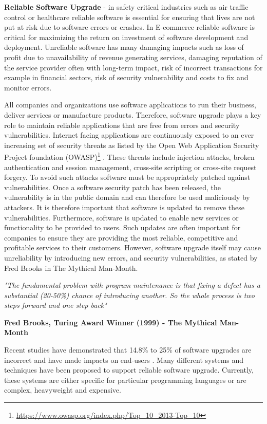 \documentclass[a4paper,11pt,twoside]{report}
\begin{document}
\setlength{\leftskip}{0.5cm}
\setlength{\rightskip}{0.5cm}
\noindent \textbf{Reliable Software Upgrade} - in safety critical industries such as air traffic control or healthcare reliable software is essential for ensuring that lives are not put at risk due to software errors or crashes. In E-commerce reliable software is critical for maximizing the return on investment of software development and deployment. Unreliable software has many damaging impacts such as loss of profit due to unavailability of revenue generating services, damaging reputation of the service provider often with long-term impact, risk of incorrect transactions for example in financial sectors, risk of security vulnerability and costs to fix and monitor errors.

All companies and organizations use software applications to run their business, deliver services or manufacture products. Therefore, software upgrade plays a key role to maintain reliable applications that are free from errors and security vulnerabilities.   Internet facing applications are continuously exposed to an ever increasing set of security threats as listed by the Open Web Application Security Project foundation (OWASP)\footnote{\url{https://www.owasp.org/index.php/Top_10_2013-Top_10}} . These threats include injection attacks, broken authentication and session management, cross-site scripting or cross-site request forgery. To avoid such attacks software must be appropriately patched against vulnerabilities. Once a software security patch has been released, the vulnerability is in the public domain and can therefore be used maliciously by attackers. It is therefore important that software is updated to remove these vulnerabilities.  Furthermore, software is updated to enable new services or functionality to be provided to users. Such updates are often important for companies to ensure they are providing the most reliable, competitive and profitable services to their customers. However, software upgrade itself may cause unreliability by introducing new errors, and security vulnerabilities, as stated by Fred Brooks in The Mythical Man-Month. 

\noindent\textit{ "The fundamental problem with program maintenance is that fixing a defect has a substantial (20-50\%) chance of introducing another. So the whole process is two steps forward and one step back"}  

\hfill \textbf{Fred Brooks, Turing Award Winner (1999) -  The Mythical Man-Month}\bigskip

Recent studies have demonstrated that 14.8\% to 25\% of software upgrades are incorrect and have made impacts on end-users \cite{bugs}. Many different systems and techniques have been proposed to support reliable software upgrade. Currently, these systems are either specific for particular programming languages or are complex, heavyweight and expensive.\medskip 
\end{document}
